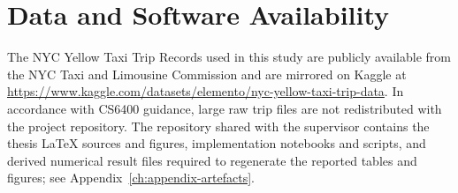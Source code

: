 \section{Data and Software Availability}

The NYC Yellow Taxi Trip Records used in this study are publicly available from the NYC Taxi and Limousine Commission and are mirrored on Kaggle at \url{https://www.kaggle.com/datasets/elemento/nyc-yellow-taxi-trip-data}. In accordance with CS6400 guidance, large raw trip files are not redistributed with the project repository. The repository shared with the supervisor contains the thesis LaTeX sources and figures, implementation notebooks and scripts, and derived numerical result files required to regenerate the reported tables and figures; see Appendix~\ref{ch:appendix-artefacts}.
